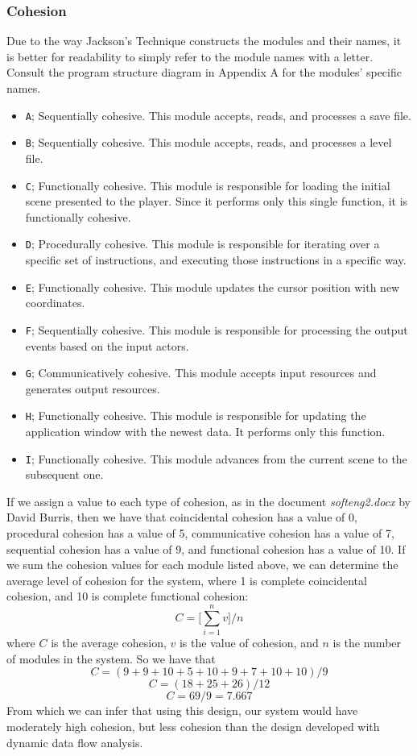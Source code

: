 \documentclass{article}
\begin{document}
		\subsubsection{Cohesion}
			Due to the way Jackson's Technique constructs the modules and their names, it is better for readability to simply refer to the module names with a letter. Consult the program structure diagram in Appendix A for the modules' specific names. 
			\begin{itemize}
				\item \texttt{A}; Sequentially cohesive. This module accepts, reads, and processes a save file. 
				\item \texttt{B}; Sequentially cohesive. This module accepts, reads, and processes a level file. 
				\item \texttt{C}; Functionally cohesive. This module is responsible for loading the initial scene presented to the player. Since it performs only this single function, it is functionally cohesive. 
				\item \texttt{D}; Procedurally cohesive. This module is responsible for iterating over a specific set of instructions, and executing those instructions in a specific way. 
				\item \texttt{E}; Functionally cohesive. This module updates the cursor position with new coordinates. 
				\item \texttt{F}; Sequentially cohesive. This module is responsible for processing the output events based on the input actors. 
				\item \texttt{G}; Communicatively cohesive. This module accepts input resources and generates output resources. 
				\item \texttt{H}; Functionally cohesive. This module is responsible for updating the application window with the newest data. It performs only this function. 
				\item \texttt{I}; Functionally cohesive. This module advances from the current scene to the subsequent one. 
			\end{itemize}
			If we assign a value to each type of cohesion, as in the document \emph{softeng2.docx} by David Burris, then we have that coincidental cohesion has a value of 0, procedural cohesion has a value of 5, communicative cohesion has a value of 7, sequential cohesion has a value of 9, and functional cohesion has a value of 10. If we sum the cohesion values for each module listed above, we can determine the average level of cohesion for the system, where 1 is complete coincidental cohesion, and 10 is complete functional cohesion:
			$$C = \Bigg[\sum_{i=1}^{n}v\Bigg] /n$$
			where $C$ is the average cohesion, $v$ is the value of cohesion, and $n$ is the number of modules in the system. So we have that
			$$C = (9 + 9 + 10 + 5 + 10 + 9 + 7 + 10 + 10)/9$$
			$$C = (18 + 25 + 26)/12$$
			$$C = 69/9 = 7.667$$
			From which we can infer that using this design, our system would have moderately high cohesion, but less cohesion than the design developed with dynamic data flow analysis. 
\end{document}
